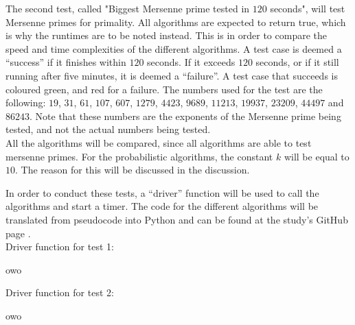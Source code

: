\documentclass[main.tex]{subfiles}
\begin{document}
The second test, called "Biggest Mersenne prime tested in $120$ seconds", will
test Mersenne primes for primality. All algorithms are expected to return true,
which is why the runtimes are to be noted instead. This is in order to compare
the speed and time complexities of the different algorithms. A test case is
deemed a ``success'' if it finishes within $120$ seconds. If it exceeds $120$
seconds, or if it still running after five minutes, it is deemed a ``failure''.
A test case that succeeds is coloured green, and red for a failure. The numbers
used for the test are the following: $19$, $31$, $61$, $107$, $607$, $1279$,
$4423$, $9689$, $11213$, $19937$, $23209$, $44497$ and $86243$. Note that these
numbers are the exponents of the Mersenne prime being tested, and not
the actual numbers being tested. \\

All the algorithms will be compared, since all algorithms are able to test
mersenne primes. For the probabilistic algorithms, the constant $k$ will be
equal to $10$. The reason for this will be discussed in the discussion. \newline

In order to conduct these tests, a ``driver'' function will be used to call the
algorithms and start a timer. The code for the different algorithms will be
translated from pseudocode into Python and can be found at the study's GitHub
page \cite{github}. \\

Driver function for test 1:

\begin{python}
  owo
\end{python}

\vspace{5mm}

Driver function for test 2:

\begin{python}
  owo
\end{python}
\end{document}
